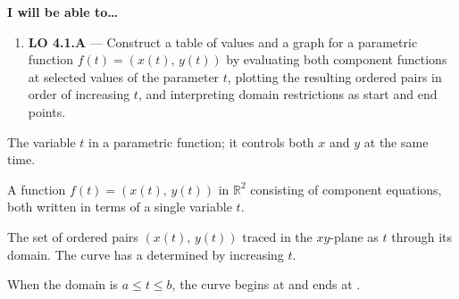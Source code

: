 \documentclass[10pt]{article}
\begin{document}
\namedateperiod

\vspace{0.10in}

\begin{objectivebox}
\textbf{I will be able to\ldots}
\begin{enumerate}[leftmargin=1.5em, itemsep=4pt]
  \item \textbf{LO 4.1.A} --- Construct a table of values and a graph
    for a parametric function $f(t) = (x(t),\, y(t))$ by evaluating both
    component functions at selected values of the parameter $t$, plotting
    the resulting ordered pairs in order of increasing $t$, and
    interpreting domain restrictions as start and end points.
\end{enumerate}
\end{objectivebox}

\vspace{0.08in}

\begin{vocabbox}
\begin{description}[leftmargin=0pt, itemsep=6pt]
  \item[\termblanklong{parameter}]
    The  variable $t$ in a parametric function;
    it controls both $x$ and $y$ at the same time.

  \item[\termblanklong{parametric function}]
    A function $f(t) = (x(t),\, y(t))$ in $\mathbb{R}^2$ consisting of
     component equations, both written in terms of a single
    variable $t$.

  \item[\termblanklong{parametric curve}]
    The set of ordered pairs $(x(t),\, y(t))$ traced in the $xy$-plane
    as $t$  through its domain.
    The curve has a  determined by
    increasing $t$.

  \item[\termblanklong{start / end point}]
    When the domain is $a \le t \le b$, the curve begins at
     and ends at .
\end{description}
\end{vocabbox}
\end{document}
